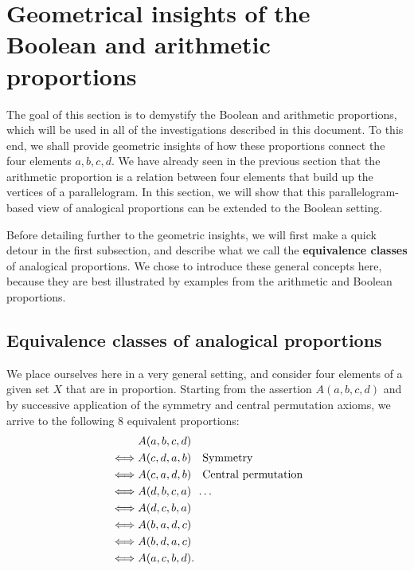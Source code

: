 \section{Geometrical insights of the Boolean and arithmetic proportions}

The goal of this section is to demystify the Boolean and arithmetic
proportions, which will be used in all of the investigations described in this
document. To this end, we shall provide geometric insights of how these
proportions connect the four elements $a, b, c, d$.  We have already seen in the
previous section that the arithmetic proportion is a relation between four
elements that build up the vertices of a parallelogram.  In this section, we
will show that this parallelogram-based view of analogical proportions can be
extended to the Boolean setting.

Before detailing further to the geometric insights, we will first make a quick
detour in the first subsection, and describe what we call the
\textbf{equivalence classes} of analogical proportions. We chose to introduce
these general concepts here, because they are best illustrated by examples from
the arithmetic and Boolean proportions.

\subsection{Equivalence classes of analogical proportions}

We place ourselves here in a very general setting, and consider four elements of
a given set $X$ that are in proportion.  Starting from the assertion $A(a, b,
c, d)$ and by successive application of the symmetry and central permutation
axioms, we arrive to the following $8$ equivalent proportions:
\begin{align*}
       &A(a, b, c, d)\\
  \iff &A(c, d, a, b) \text{~~ Symmetry}\\
  \iff &A(c, a, d, b) \text{~~ Central permutation}\\
  \iff &A(d, b, c, a) \text{~~\dots}\\
  \iff &A(d, c, b, a)\\
  \iff &A(b, a, d, c)\\
  \iff &A(b, d, a, c)\\
  \iff &A(a, c, b, d).
\end{align*}

